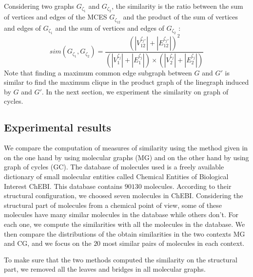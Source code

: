 \documentclass[journal=jacsat,manuscript=article]{achemso}
\begin{document}
Considering two graphs $G_{\zeta_1}$ and $G_{\zeta_2}$,  the similarity  is the ratio between the sum of vertices and edges of the MCES $G_{\zeta_{12}}$ and the product of the sum of vertices and edges of $G_{\zeta_1}$ and the sum of vertices and edges of $G_{\zeta_2}$ :
 \begin{equation}
    sim(G_{\zeta_1},G_{\zeta_2}) = \frac{(|V^{\zeta_{j''}}_{12}| + |E^{\zeta_{j''}}_{12}| ) ^2 }{(|V^{\zeta_j}_1| + |E^{\zeta_j}_1| )\times (|V^{\zeta_j}_2| + |E^{\zeta_j}_2| )}
 \end{equation}
 Note that finding a maximum common edge subgraph between $G$ and $G'$ is similar to find the maximum clique in the product graph of the linegraph induced by $G$ and $G'$. In the next section, we experiment the similarity on graph of cycles. 
 
 
 
 \subsection{Experimental results}
 
We compare the computation of measures of similarity using the method given in  \cite{Raymond2002} on the one hand by using molecular graphs (MG) and on the other hand by using graph of cycles (GC). The database of molecules used is a freely available dictionary of small molecular entities called Chemical Entities of Biological Interest ChEBI. This database contains $ 90130$ molecules. According to their structural configuration, we choosed seven molecules in ChEBI. Considering the structural part of molecules from a chemical point of view, some of these molecules have many similar molecules in the database while others don't. For each one, we compute the similarities with all the molecules in the database. We then compare the distributions of  the obtain similarities in the two contexts MG and CG, and we focus on the $20$ most similar pairs of molecules in each context.  

To make sure that the two methods computed the similarity on the structural part, we removed all the leaves and bridges in all molecular graphs.
 
\end{document}
